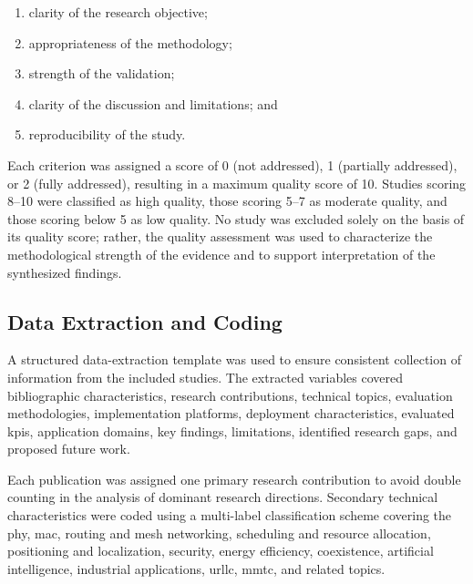 \begin{enumerate}

    \item clarity of the research objective;

    \item appropriateness of the methodology;

    \item strength of the validation;

    \item clarity of the discussion and limitations; and

    \item reproducibility of the study.

\end{enumerate}

Each criterion was assigned a score of 0 (not addressed), 1 (partially addressed), or 2 (fully addressed), resulting in a maximum quality score of 10. Studies scoring 8--10 were classified as high quality, those scoring 5--7 as moderate quality, and those scoring below 5 as low quality. No study was excluded solely on the basis of its quality score; rather, the quality assessment was used to characterize the methodological strength of the evidence and to support interpretation of the synthesized findings.

\subsection{Data Extraction and Coding}
\label{subsec:data_extraction}

A structured data-extraction template was used to ensure consistent collection of information from the included studies. The extracted variables covered bibliographic characteristics, research contributions, technical topics, evaluation methodologies, implementation platforms, deployment characteristics, evaluated \glspl{kpi}, application domains, key findings, limitations, identified research gaps, and proposed future work.

Each publication was assigned one primary research contribution to avoid double counting in the analysis of dominant research directions. Secondary technical characteristics were coded using a multi-label classification scheme covering the \gls{phy}, \gls{mac}, routing and mesh networking, scheduling and resource allocation, positioning and localization, security, energy efficiency, coexistence, artificial intelligence, industrial applications, \gls{urllc}, \gls{mmtc}, and related topics.

